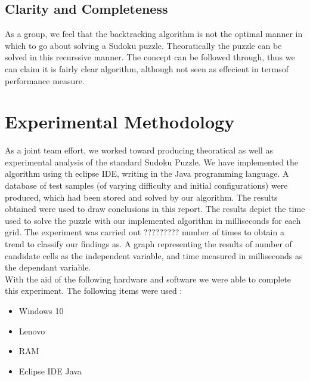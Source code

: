 \documentclass[12pt]{article}
\begin{document}
\subsection{Clarity and Completeness}
\begin{flushleft}
As a group, we feel that the backtracking algorithm is not the optimal manner in which to go about solving a Sudoku puzzle. Theoratically the puzzle can be solved in this recurssive manner. The concept can be followed through, thus we can claim it is fairly clear algorithm, although not seen as effecient in termsof performance measure. 
\end{flushleft}

\section{Experimental Methodology}
As a joint team effort, we worked toward producing theoratical as well as experimental analysis of the standard Sudoku Puzzle. We have implemented the algorithm using th eclipse IDE, writing in the Java programming language. A database of test samples (of varying difficulty and initial configurations) were produced, which had been stored and solved by our algorithm. The results obtained were used to draw conclusions in this report. The results depict the time used to solve the puzzle with our implemented algorithm in milliseconds for each grid. The experiment was carried out ????????? number of times to obtain a trend to classify our findings as. A graph representing the results of number of candidate cells as the independent variable, and time measured in milliseconds as the dependant variable. \\
With the aid of the following hardware and software we were able to complete this experiment. The following items were used :
\begin{itemize}
\item Windows 10
\item Lenovo 
\item RAM
\item Eclipse IDE Java
\end{itemize}
\end{document}
